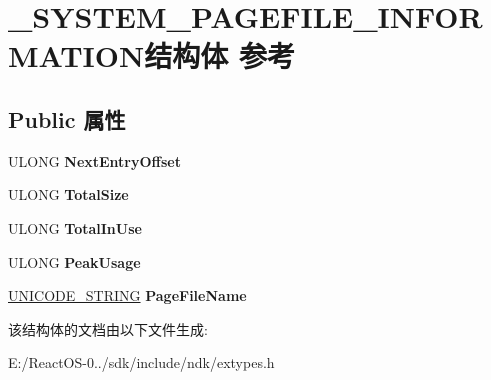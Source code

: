 \hypertarget{struct___s_y_s_t_e_m___p_a_g_e_f_i_l_e___i_n_f_o_r_m_a_t_i_o_n}{}\section{\+\_\+\+S\+Y\+S\+T\+E\+M\+\_\+\+P\+A\+G\+E\+F\+I\+L\+E\+\_\+\+I\+N\+F\+O\+R\+M\+A\+T\+I\+O\+N结构体 参考}
\label{struct___s_y_s_t_e_m___p_a_g_e_f_i_l_e___i_n_f_o_r_m_a_t_i_o_n}
\subsection*{Public 属性}
\begin{DoxyCompactItemize}
\item 
\mbox{\label{struct___s_y_s_t_e_m___p_a_g_e_f_i_l_e___i_n_f_o_r_m_a_t_i_o_n_a1db45072cef35a9423d7e9d3516f338d}} 
U\+L\+O\+NG {\bfseries Next\+Entry\+Offset}
\item 
\mbox{\label{struct___s_y_s_t_e_m___p_a_g_e_f_i_l_e___i_n_f_o_r_m_a_t_i_o_n_a82844e32c4262adec6b8590b4f95c2f1}} 
U\+L\+O\+NG {\bfseries Total\+Size}
\item 
\mbox{\label{struct___s_y_s_t_e_m___p_a_g_e_f_i_l_e___i_n_f_o_r_m_a_t_i_o_n_a4f8f4d89352265477f64a498d064cf88}} 
U\+L\+O\+NG {\bfseries Total\+In\+Use}
\item 
\mbox{\label{struct___s_y_s_t_e_m___p_a_g_e_f_i_l_e___i_n_f_o_r_m_a_t_i_o_n_abe74c48d9bc939152c8f31626b248fdb}} 
U\+L\+O\+NG {\bfseries Peak\+Usage}
\item 
\mbox{\label{struct___s_y_s_t_e_m___p_a_g_e_f_i_l_e___i_n_f_o_r_m_a_t_i_o_n_a2920e930f3e38fe5d677274d06f46ea1}} 
\hyperlink{struct___u_n_i_c_o_d_e___s_t_r_i_n_g}{U\+N\+I\+C\+O\+D\+E\+\_\+\+S\+T\+R\+I\+NG} {\bfseries Page\+File\+Name}
\end{DoxyCompactItemize}


该结构体的文档由以下文件生成\+:\begin{DoxyCompactItemize}
\item 
E\+:/\+React\+O\+S-\/0../sdk/include/ndk/extypes.\+h\end{DoxyCompactItemize}
